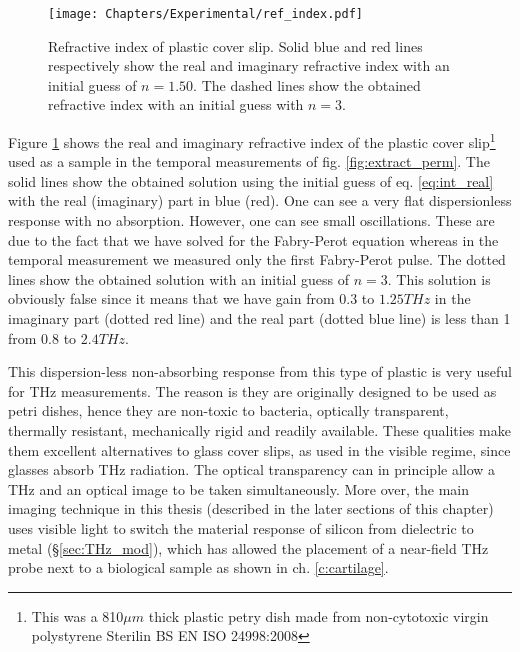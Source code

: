 \begin{figure}[h!]\centering
\texttt{[image: Chapters/Experimental/ref\_index.pdf]}
\caption{Refractive index of plastic cover slip. Solid blue and red lines respectively show the real and imaginary refractive index with an initial guess of $n=1.50$. The dashed lines show the obtained refractive index with an initial guess with $n=3$.}
\label{fig:ref_index}
\end{figure}

Figure \ref{fig:ref_index} shows the real and imaginary refractive index of the plastic cover slip\footnote{This was a 810$\mu m$ thick plastic petry dish made from non-cytotoxic virgin polystyrene Sterilin BS EN ISO 24998:2008} used as a sample in the temporal measurements of fig. \ref{fig:extract_perm}. The solid lines show the obtained solution using the initial guess of eq. \eqref{eq:int_real} with the real (imaginary) part in blue (red). One can see a very flat dispersionless response with no absorption. However, one can see small oscillations. These are due to the fact that we have solved for the Fabry-Perot equation whereas in the temporal measurement we measured only the first Fabry-Perot pulse. The dotted lines show the obtained solution with an initial guess of $n=3$. This solution is obviously false since it means that we have gain from $0.3$ to $1.25THz$ in the imaginary part (dotted red line) and the real part (dotted blue line) is less than 1 from $0.8$ to $2.4THz$. 


This dispersion-less non-absorbing response from this type of plastic is very useful for THz measurements. The reason is they are originally designed to be used as petri dishes, hence they are non-toxic to bacteria, optically transparent, thermally resistant, mechanically rigid and readily available. These qualities make them excellent alternatives to glass cover slips, as used in the visible regime, since glasses absorb THz radiation. The optical transparency can in principle allow a THz and an optical image to be taken simultaneously. More over, the main imaging technique in this thesis (described in the later sections of this chapter) uses visible light to switch the material response of silicon from dielectric to metal (\S \ref{sec:THz_mod}), which has allowed the placement of a near-field THz probe next to a biological sample as shown in ch. \ref{c:cartilage}. 


